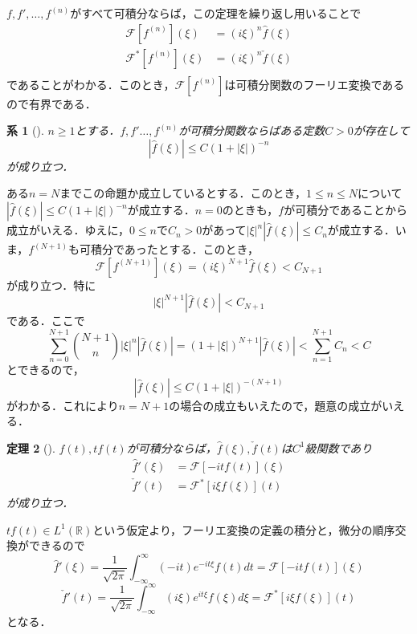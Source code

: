 \documentclass[dvipdfmx,a4j,10pt]{jsarticle}
\makeatletter
\theoremstyle{mystyle1}
\newtheorem{theorem}{定理}[section]
\newtheorem{corollary}[theorem]{系}
\theoremstyle{mystyle3}
\theoremstyle{mystyle4}
\theoremstyle{mystyle6}
\theoremstyle{mystyle2}
\theoremstyle{mystyle5}
\renewenvironment{proof}[1][\proofname]{\par
  \pushQED{\qed}%
  \normalfont
  \topsep6\p@\@plus6\p@ \trivlist
  \item[\hskip\labelsep{\bfseries\sffamily #1}]\ignorespaces
}{%
  \popQED\endtrivlist\@endpefalse
}
\renewcommand\proofname{証明}
\newenvironment{cor}[1][]
{\begin{tcolorbox}[
    enhanced,
    boxrule=0pt,
    arc=0mm,
    frame hidden,
    borderline west={2pt}{-4pt}{blue!50!black},
    breakable = true
    ]
    \begin{corollary}[#1]
}
{\end{corollary}\end{tcolorbox}}
\newenvironment{thm}[1][]
{\begin{tcolorbox}[
    enhanced,
    boxrule=0pt,
    arc=0mm,
    frame hidden,
    borderline west={2pt}{-4pt}{red},
    breakable = true
    ]
    \begin{theorem}[#1]
}
{\end{theorem}\end{tcolorbox}}
\makeatother
\begin{document}
$f,f',\ldots,f^{(n)}$がすべて可積分ならば，この定理を繰り返し用いることで
\[
	\begin{split}
		\mathcal{F}[f^{(n)}](\xi)&=(i\xi)^n\hat f(\xi) \\
		\mathcal{F}^*[f^{(n)}](\xi)&=(i\xi)^n\check f(\xi) \\
	\end{split}
\]
であることがわかる．このとき，$\mathcal{F}[f^{(n)}]$は可積分関数のフーリエ変換であるので有界である．

\begin{cor}\label{cor:3-10}
	$n\geq 1$とする．$f,f'\ldots,f^{(n)}$が可積分関数ならばある定数$C>0$が存在して
	\[
		|\hat f(\xi)|\leq C(1+|\xi|)^{-n}
	\]
	が成り立つ．
\end{cor}

\begin{proof}
	ある$n=N$までこの命題か成立しているとする．このとき，$1\leq n\leq N$について$|\hat f(\xi)|\leq C(1+|\xi|)^{-n}$が成立する．$n=0$のときも，$f$が可積分であることから成立がいえる．ゆえに，$0\leq n$で$C_n>0$があって$|\xi|^n|\hat f(\xi)|\leq C_n$が成立する．いま，$f^{(N+1)}$も可積分であったとする．このとき，
	\[
		\mathcal{F}[f^{(N+1)}](\xi)=(i\xi)^{N+1}\hat f(\xi)< C_{N+1}
	\]
	が成り立つ．特に
	\[
		|\xi|^{N+1}|\hat f(\xi)|<C_{N+1}
	\]
	である．ここで
	\[
		\sum_{n=0}^{N+1} \binom{N+1}{n} |\xi|^n|\hat f(\xi)|=(1+|\xi|)^{N+1}|\hat f(\xi)|<\sum_{n=1}^{N+1} C_n<C
	\]
	とできるので，
	\[
		|\hat f(\xi)|\leq C(1+|\xi|)^{-(N+1)}
	\]
	がわかる．これにより$n=N+1$の場合の成立もいえたので，題意の成立がいえる．
\end{proof}

\begin{thm}\label{thm:3-11}
	$f(t),tf(t)$が可積分ならば，$\hat f(\xi),\check f(t)$は$C^1$級関数であり
	\[
		\begin{split}
			\hat f'(\xi)&=\mathcal{F}[-itf(t)](\xi)\\
			\check f'(t)&=\mathcal{F}^*[i\xi f(\xi)](t)
		\end{split}
	\]
	が成り立つ．
\end{thm}

\begin{proof}
	$tf(t)\in L^1(\mathbb{R})$という仮定より，フーリエ変換の定義の積分と，微分の順序交換ができるので
	\[
		\hat f'(\xi)=\frac{1}{\sqrt{2\pi}}\int_{-\infty}^\infty (-it)e^{-it\xi}f(t)dt=\mathcal{F}[-itf(t)](\xi)
	\]
	\[
		\check f'(t)=\frac{1}{\sqrt{2\pi}}\int_{-\infty}^\infty (i\xi)e^{it\xi}f(\xi)d\xi=\mathcal{F}^*[i\xi f(\xi)](t)
	\]
	となる．
\end{proof}
\end{document}
